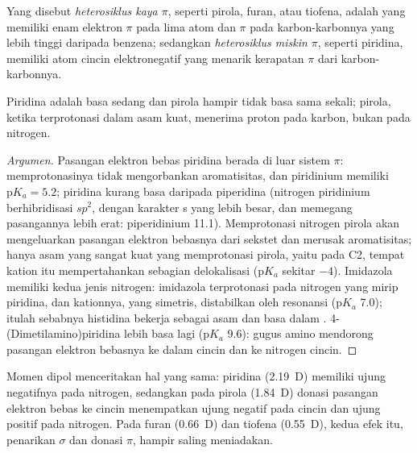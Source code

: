 \begin{definition}\label{def:b3:heterocycles:pi-character}
Yang disebut \emph{heterosiklus kaya $\pi$}, seperti
pirola, furan, atau tiofena, adalah  yang memiliki enam elektron $\pi$ pada lima atom dan  $\pi$ pada karbon-karbonnya yang lebih tinggi daripada benzena; sedangkan \emph{heterosiklus miskin
$\pi$}, seperti piridina, memiliki
atom cincin elektronegatif yang menarik kerapatan $\pi$ dari karbon-karbonnya.
\end{definition}

\begin{proposition}[Kebasaan]\label{prop:b3:heterocycles:basicity}
Piridina adalah basa sedang dan pirola hampir tidak basa sama sekali; pirola, ketika
terprotonasi dalam asam kuat, menerima proton pada karbon, bukan pada nitrogen.
\end{proposition}

\begin{proof}[Argumen]
Pasangan elektron bebas piridina berada di luar sistem $\pi$: memprotonasinya tidak mengorbankan
aromatisitas, dan piridinium memiliki $\mathrm pK_a = 5.2$; piridina kurang basa daripada piperidina
(nitrogen piridinium berhibridisasi $sp^2$, dengan karakter s yang lebih besar, dan memegang pasangannya lebih
erat: piperidinium 11.1). Memprotonasi nitrogen pirola akan mengeluarkan pasangan elektron bebasnya
dari sekstet dan merusak aromatisitas; hanya asam yang sangat kuat yang
memprotonasi pirola, yaitu pada C2, tempat kation itu mempertahankan sebagian delokalisasi
($\mathrm pK_a$ sekitar $-4$). Imidazola memiliki kedua jenis nitrogen: imidazola terprotonasi pada
nitrogen yang mirip piridina, dan kationnya, yang simetris, distabilkan oleh resonansi ($\mathrm pK_a$
7.0); itulah sebabnya histidina bekerja sebagai asam dan basa dalam .
4-(Dimetilamino)piridina lebih basa lagi ($\mathrm pK_a$ 9.6): gugus amino mendorong
pasangan elektron bebasnya ke dalam cincin dan ke nitrogen cincin.
\end{proof}

Momen dipol menceritakan hal yang sama: piridina (\qty{2.19}{D}) memiliki ujung negatifnya
pada nitrogen, sedangkan pada pirola (\qty{1.84}{D}) donasi pasangan elektron bebas ke cincin
menempatkan ujung negatif pada cincin dan ujung positif pada nitrogen. Pada furan
(\qty{0.66}{D}) dan tiofena (\qty{0.55}{D}), kedua efek itu, penarikan $\sigma$ dan donasi $\pi$, hampir
saling meniadakan.

